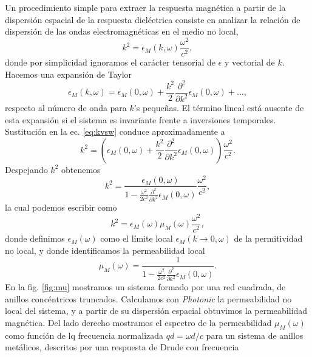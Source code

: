 \documentclass[12pt]{article}
\begin{document}
Un procedimiento simple para extraer la respuesta magnética a partir
de la dispersión espacial de la respuesta dieléctrica consiste en
analizar la relación de dispersión de las ondas electromagnéticas en
el medio no local,
\begin{equation}
  \label{eq:kvsw}
  k^2=\epsilon_M(k,\omega) \frac{\omega^2}{c^2},
\end{equation}
donde por simplicidad ignoramos el carácter tensorial de $\epsilon$ y
vectorial de $k$. Hacemos una expansión de Taylor
\begin{equation}
  \label{eq:taylor}
  \epsilon_M(k,\omega)=\epsilon_M(0,\omega)+\frac{k^2}{2}\frac{\partial^2}{\partial
    k^2}\epsilon_M(0,\omega)+\ldots,
\end{equation}
respecto al número de onda para $k$'s pequeñas. El término lineal
está ausente de esta expansión si el sistema es invariante frente a
inversiones temporales. Sustitución en la ec. \eqref{eq:kvsw} conduce
aproximadamente a
\begin{equation}
  \label{eq:kvsw1}
  k^2= \left(\epsilon_M(0,\omega)+\frac{k^2}{2}\frac{\partial^2}{\partial
    k^2}\epsilon_M(0,\omega)\right) \frac{\omega^2}{c^2}.
\end{equation}
Despejando $k^2$ obtenemos
\begin{equation}
  \label{eq:kvsw2}
  k^2= \frac{\epsilon_M(0,\omega)}{1-\frac{\omega^2}{2c^2}\frac{\partial^2}{\partial
    k^2}\epsilon_M(0,\omega)} \frac{\omega^2}{c^2},
\end{equation}
la cual podemos escribir como
\begin{equation}
  \label{eq:kvsw3}
  k^2=\epsilon_M(\omega)\mu_M(\omega)\frac{\omega^2}{c^2},
\end{equation}
donde definimos $\epsilon_M(\omega)$ como el límite local
$\epsilon_M(k\to0, \omega)$ de la permitividad no local, y donde
identificamos la permeabilidad local
\begin{equation}
  \label{eq:mu}
  \mu_M(\omega)=\frac{1}{1-\frac{\omega^2}{2c^2}\frac{\partial^2}{\partial
    k^2}\epsilon_M(0,\omega)}.
\end{equation}
En la fig. \ref{fig:mu} mostramos un sistema formado por una red
cuadrada, de anillos concéntricos truncados. Calculamos con {\em
  Photonic} la permeabilidad no local del sistema, y a partir de su
dispersión espacial obtuvimos la permeabilidad magnética.\cite{lucila} Del lado
derecho mostramos el espectro de la permeabilidad $\mu_M(\omega)$ como
función de lq frecuencia normalizada $qd=\omega d/c$ para un sistema de
anillos metálicos, descritos por una respuesta de Drude con frecuencia
\end{document}
